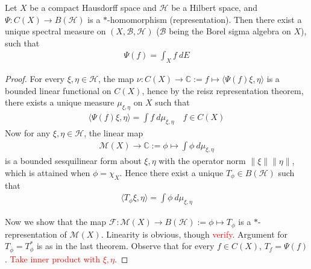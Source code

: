 

\begin{theorem}
  Let $X$ be a compact Hausdorff space and $\mathcal{H}$ be a
  Hilbert space, and $\Psi: C(X) \to B(\mathcal{H})$ is a
  $*$-homomorphism (representation). Then there exist a unique
  spectral measure on $(X, \mathcal{B}, \mathcal{H})$ ($\mathcal{B}$
  being the Borel sigma algebra on $X$), such that
  \begin{align*}
    \Psi(f) = \int_X  f \ d E
  \end{align*}
\end{theorem}
\begin{proof}
  For every $\xi, \eta \in \mathcal{H}$, the map $ \nu : C(X) \to
  \mathbb{C}  :=  f \mapsto \langle  \Psi(f) \xi ,  \eta \rangle $ is
  a bounded linear functional on $C(X)$, hence by the reisz
  representation theorem, there exists a unique measure $\mu_{\xi,
  \eta}$ on $X$ such that
  \begin{align*}
    \langle \Psi(f) \xi ,  \eta \rangle  = \int f \ d \mu_{\xi,
    \eta} \quad f \in C(X)
  \end{align*}
  Now for any $\xi, \eta \in \mathcal{H}$, the linear map
  \begin{align*}
    \mathcal{M}(X) \to  \mathbb{C} := \phi
    \mapsto \int \phi \ d \mu_{\xi, \eta}
  \end{align*}
  is a bounded sesquilinear form about $\xi, \eta$ with the operator
  norm $\|\xi\|\|\eta\|$, which is attained when $\phi = \chi_X$. Hence
  there exist a unique $T_\phi \in B(\mathcal{H})$ such that
  \begin{align*}
    \langle T_\phi \xi ,  \eta \rangle = \int \phi \ d \mu_{\xi, \eta}
  \end{align*}

  Now we show that the map $\mathscr{F}: \mathcal{M}(X)\to B(\mathcal{H})  :=
  \phi \mapsto    T_\phi$ is a $*$-representation of
  $\mathcal{M}(X)$. Linearity is obvious, though
  \textcolor{red}{verify}. Argument for $T_{\overline{ \phi}} =
  T_{\phi}^*$ is as in the last theorem.
  Observe that for every $f \in C(X)$, $T_f = \Psi(f)$.
  \textcolor{red}{Take inner product with $\xi, \eta$}.
  \marginnote{ \scriptsize \it \textcolor{red}{verify the rest}}


\end{proof}
